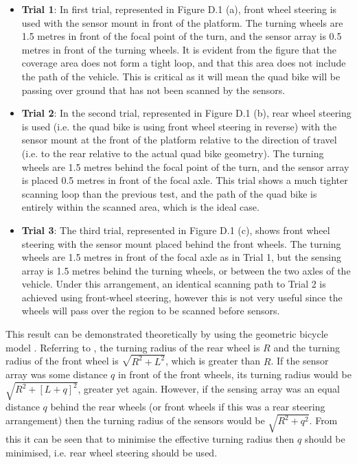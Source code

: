 \documentclass[main.tex]{subfiles}
\begin{document}
\begin{appendices}
\begin{itemize}
\item \textbf{Trial 1}: In first trial, represented in Figure D.1 (a), front wheel steering is used with the sensor mount in front of the platform. The turning wheels are 1.5 metres in front of the focal point of the turn, and the sensor array is 0.5 metres in front of the turning wheels. It is evident from the figure that the coverage area does not form a tight loop, and that this area does not include the path of the vehicle. This is critical as it will mean the quad bike will be passing over ground that has not been scanned by the sensors.
\item \textbf{Trial 2}: In the second trial, represented in Figure D.1 (b), rear wheel steering is used (i.e. the quad bike is using front wheel steering in reverse) with the sensor mount at the front of the platform relative to the direction of travel (i.e. to the rear relative to the actual quad bike geometry). The turning wheels are 1.5 metres behind the focal point of the turn, and the sensor array is placed 0.5 metres in front of the focal axle. This trial shows a much tighter scanning loop than the previous test, and the path of the quad bike is entirely within the scanned area, which is the ideal case.
\item \textbf{Trial 3}: The third trial, represented in Figure D.1 (c), shows front wheel steering with the sensor mount placed behind the front wheels. The turning wheels are 1.5 metres in front of the focal axle as in Trial 1, but the sensing array is 1.5 metres behind the turning wheels, or between the two axles of the vehicle. Under this arrangement, an identical scanning path to Trial 2 is achieved using front-wheel steering, however this is not very useful since the wheels will pass over the region to be scanned before sensors.
\end{itemize}

This result can be demonstrated theoretically by using the geometric bicycle model \parencite{snider2009}. Referring to , the turning radius of the rear wheel is $R$ and the turning radius of the front wheel is $\sqrt{R^2 + L^2}$, which is greater than $R$. If the sensor array was some distance $q$ in front of the front wheels, its turning radius would be $\sqrt{R^2 + [L+q]^2}$, greater yet again. However, if the sensing array was an equal distance $q$ behind the rear wheels (or front wheels if this was a rear steering arrangement) then the turning radius of the sensors would be $\sqrt{R^2 + q^2}$. From this it can be seen that to minimise the effective turning radius then $q$ should be minimised, i.e. rear wheel steering should be used. 



\end{appendices}
\end{document}
